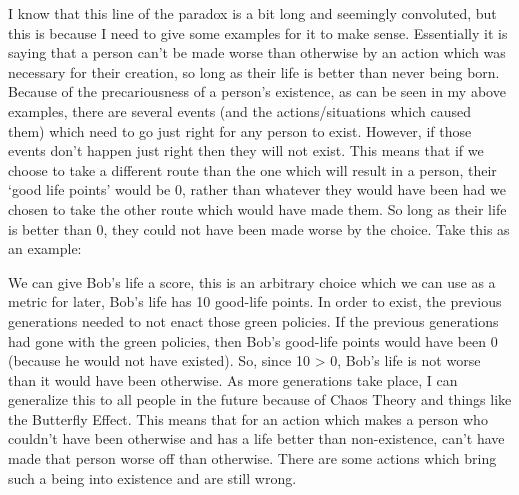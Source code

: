 I know that this line of the paradox is a bit long and seemingly convoluted, but this is because I need to give some examples for it to make sense. Essentially it is saying that a person can't be made worse than otherwise by an action which was necessary for their creation, so long as their life is better than never being born. Because of the precariousness of a person's existence, as can be seen in my above examples, there are several events (and the actions/situations which caused them) which need to go just right for any person to exist. However, if those events don't happen just right then they will not exist. This means that if we choose to take a different route than the one which will result in a person, their `good life points' would be 0, rather than whatever they would have been had we chosen to take the other route which would have made them. So long as their life is better than 0, they could not have been made worse by the choice. Take this as an example:


We can give Bob's life a score, this is an arbitrary choice which we can use as a metric for later, Bob's life has 10 good-life points. In order to exist, the previous generations needed to not enact those green policies. If the previous generations had gone with the green policies, then Bob's good-life points would have been 0 (because he would not have existed). So, since 10 > 0, Bob's life is not worse than it would have been otherwise. As more generations take place, I can generalize this to all people in the future because of Chaos Theory and things like the Butterfly Effect. This means that for an action which makes a person who couldn't have been otherwise and has a life better than non-existence, can't have made that person worse off than otherwise. 
There are some actions which bring such a being into existence and are still wrong.

